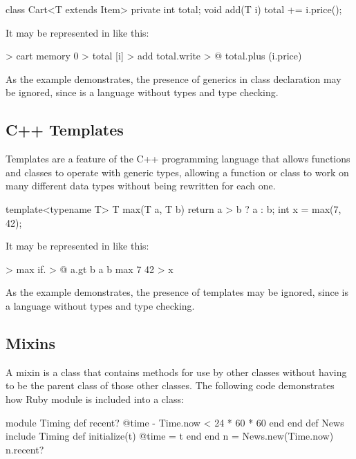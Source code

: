 \documentclass[sigplan,nonacm]{acmart}
\begin{document}
\begin{ffcode}
class Cart<T extends Item> {
  private int total;
  void add(T i) {
    total += i.price();
  }
}
\end{ffcode}

It may be represented in \eolang{} like this:

\begin{ffcode}
[] > cart
  memory 0 > total
  [i] > add
    total.write > @
      total.plus (i.price)
\end{ffcode}

As the example demonstrates, the presence of generics in class declaration may be ignored, since \eolang{} is a language without types and type checking.

\subsection{C++ Templates}
\label{sec:templates}

Templates are a feature of the C++ programming language that allows functions and classes to operate with generic types, allowing a function or class to work on many different data types without being rewritten for each one.

\begin{ffcode}
template<typename T> T max(T a, T b) {
  return a > b ? a : b;
}
int x = max(7, 42);
\end{ffcode}

It may be represented in \eolang{} like this:

\begin{ffcode}
[a b] > max
  if. > @
    a.gt b
    a
    b
max 7 42 > x
\end{ffcode}

As the example demonstrates, the presence of templates may be ignored, since \eolang{} is a language without types and type checking.

\subsection{Mixins}
\label{sec:mixins}

A mixin is a class that contains methods for use by other classes without having to be the parent class of those other classes. The following code demonstrates how Ruby module is included into a class:

\begin{ffcode}
module Timing
  def recent?
    @time - Time.now < 24 * 60 * 60
  end
end
def News
  include Timing
  def initialize(t)
    @time = t
  end
end
n = News.new(Time.now)
n.recent?
\end{ffcode}
\end{document}
